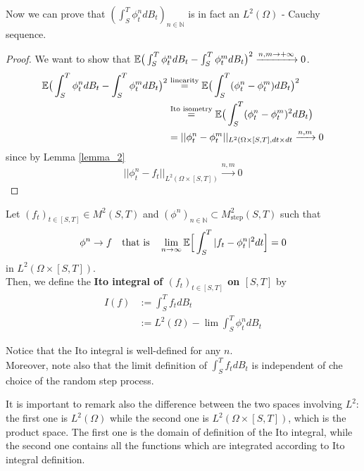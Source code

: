 Now we can prove that $(\int_S^T \phi_t^n dB_t)_{n \in \mathbb{N}}$ is in fact an $L^2(\Omega)$ - Cauchy sequence. 
\begin{ProofBox}
    \begin{proof}
We want to show that $\mathbb{E} \big( \int_S^T \phi_t^n dB_t - \int_S^T \phi_t^m dB_t\big)^2 \xrightarrow{n,m \rightarrow + \infty} 0$.
\begin{align*}
        \mathbb{E} \big( \int_S^T \phi_t^n dB_t - \int_S^T \phi_t^m dB_t\big)^2 &\stackrel{\text{linearity}}= \mathbb{E} \big( \int_S^T (\phi_t^n - \phi_t^m) dB_t\big)^2 \\
        &\stackrel{\text{Ito isometry}} = \mathbb{E}\big( \int_S^T (\phi_t^n - \phi_t^m)^2 dB_t\big) \\
        &= || \phi_t^n - \phi_t^m ||_{L^2(\Omega \times [S,T], dt \times dt} \xrightarrow{n,m}0
\end{align*}
since by Lemma \ref{lemma_2}
\begin{equation*}
    ||\phi_t^n - f_t ||_{L^2(\Omega \times [S,T])}  \xrightarrow{n,m}0 
\end{equation*}
\end{proof}
\end{ProofBox}
\begin{DefBox}
    \begin{Def}
    Let $(f_t)_{t \in [S,T]} \in M^2 (S,T)$ and $(\phi^n)_{n \in \mathbb{N}} \subset M^2_{\text{step}}(S,T)$ such that 
    \begin{equation*}
        \phi^n \rightarrow f \quad \text{that is} \quad \lim_{n \rightarrow \infty} \mathbb{E}\Big[\int_S^T |f_t - \phi_t^n | ^2 dt \Big] = 0
    \end{equation*}
     in $L^2(\Omega \times [S,T])$.\\
     Then, we define the \textbf{Ito integral of $(f_t)_{t \in [S,T]}$ on $[S,T]$} by
     \begin{align*}
         I(f) &:= \int_S^T f_t dB_t \\
         &:= L^2(\Omega)-\lim\int_S^T \phi^n_t dB_t
     \end{align*}
\end{Def}
\end{DefBox}
\begin{remark}
    Notice that the Ito integral is well-defined for any $n$.\\
    Moreover, note also that the limit definition of $\int_S^T f_t dB_t$ is independent of che choice of the random step process.
\end{remark}
It is important to remark also the difference between the two spaces involving $L^2$: the first one is $L^2(\Omega)$ while the second one is $L^2(\Omega \times [S,T])$, which is the product space. The first one is the domain of definition of the Ito integral, while the second one contains all the functions which are integrated according to Ito integral definition.\\

